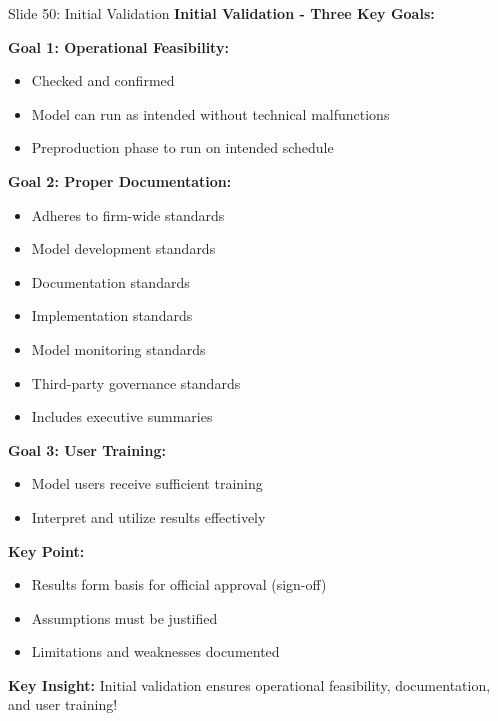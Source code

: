 \documentclass[8pt]{beamer}
\begin{document}
	\begin{frame}{Slide 50: Initial Validation}
		\fontsize{6.5}{7.5}\selectfont
		\textbf{Initial Validation - Three Key Goals:}
		
		\vspace{0.1cm}
		\textbf{Goal 1: Operational Feasibility:}
		\begin{itemize}
			\item Checked and confirmed
			\item Model can run as intended without technical malfunctions
			\item Preproduction phase to run on intended schedule
		\end{itemize}
		
		\vspace{0.1cm}
		\textbf{Goal 2: Proper Documentation:}
		\begin{itemize}
			\item Adheres to firm-wide standards
			\item Model development standards
			\item Documentation standards
			\item Implementation standards
			\item Model monitoring standards
			\item Third-party governance standards
			\item Includes executive summaries
		\end{itemize}
		
		\vspace{0.1cm}
		\textbf{Goal 3: User Training:}
		\begin{itemize}
			\item Model users receive sufficient training
			\item Interpret and utilize results effectively
		\end{itemize}
		
		\vspace{0.1cm}
		\textbf{Key Point:}
		\begin{itemize}
			\item Results form basis for official approval (sign-off)
			\item Assumptions must be justified
			\item Limitations and weaknesses documented
		\end{itemize}
		
		\textcolor{myblue}{\textbf{Key Insight:}} Initial validation ensures \textcolor{myblue}{operational feasibility, documentation, and user training}!
	\end{frame}
	
\end{document}
